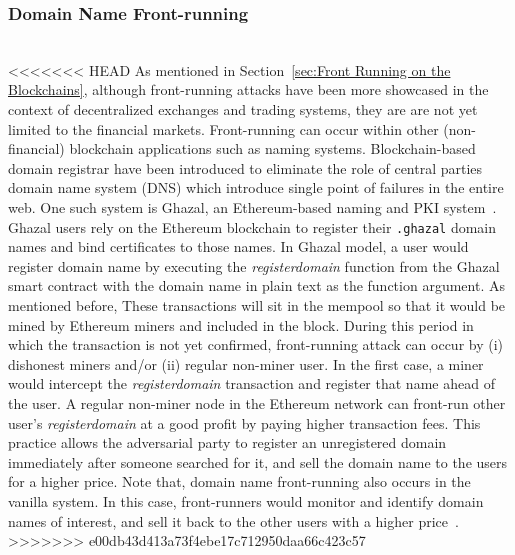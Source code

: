 \subsubsection{Domain Name Front-running} \hfill\\    %
<<<<<<< HEAD
\noindent As mentioned in Section~\ref{sec:Front Running on the Blockchains}, although front-running attacks have been more showcased in the context of decentralized exchanges and trading systems, they are are not yet limited to the financial markets. Front-running can occur within other (non-financial) blockchain applications such as naming systems. Blockchain-based domain registrar have been introduced to eliminate the role of central parties \ie domain name system (DNS) which introduce single point of failures in the entire web. One such system is Ghazal, an Ethereum-based naming and PKI system~\cite{moosavighazal}. Ghazal users rely on the Ethereum blockchain to register their \texttt{.ghazal} domain names and bind certificates to those names. In Ghazal model, a user would register domain name by executing the \textit{registerdomain} function from the Ghazal smart contract with the domain name in plain text as the function argument. As mentioned before, These transactions will sit in the mempool so that it would be mined by Ethereum miners and included in the block. During this period in which the transaction is not yet confirmed, front-running attack can occur by (i) dishonest miners and/or (ii) regular non-miner user. In the first case, a miner would intercept the \textit{registerdomain} transaction and register that name ahead of the user. A regular non-miner node in the Ethereum network can front-run other user's \textit{registerdomain} at a good profit by paying higher transaction fees. This practice allows the adversarial party  to register an unregistered domain immediately after someone searched for it, and sell the domain name to the users for a higher price. Note that, domain name front-running also occurs in the vanilla system. In this case, front-runners would monitor and identify domain names of interest, and sell it back to the other users with a higher price~\cite{sac022en33:online}.
>>>>>>> e00db43d413a73f4ebe17c712950daa66c423c57







